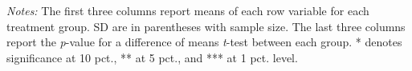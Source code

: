 \begin{table}[htbp]
{\begin{threeparttable}
\begin{tabular}{l*{6}{c}}
\bottomrule \end{tabular} \begin{tablenotes}[flushleft] \footnotesize \item \emph{Notes:} The first three columns report means of each row variable for each treatment group. SD are in parentheses with sample size. The last three columns report the \emph{p}-value for a difference of means \emph{t}-test between each group. * denotes significance at 10 pct., ** at 5 pct., and *** at 1 pct. level. \end{tablenotes} \end{threeparttable} } \end{table}

